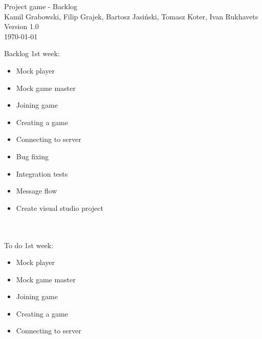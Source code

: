 \documentclass[11pt,a4paper]{article}
\begin{document}
\begin{titlepage}
\centering
\huge Project game - Backlog \\
\vspace{1.5cm}
\large Kamil Grabowski, Filip Grajek, Bartosz Jasiński, Tomasz Koter, Ivan Rukhavets \\
\vspace{1.0cm}
Version 1.0 \\
\vspace{1.0cm}
\today
\end{titlepage}



Backlog 1st week:
\begin{itemize}
\item Mock player
\item Mock game master
\item Joining game
\item Creating a game
\item Connecting to server
\item Bug fixing 
\item Integration tests
\item Message flow
\item Create visual studio project
\end{itemize}
\\~\\
To do 1st week:
\begin{itemize}
\item Mock player
\item Mock game master
\item Joining game
\item Creating a game
\item Connecting to server
\end{itemize}
\end{document}
